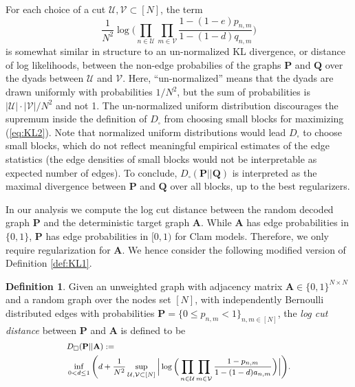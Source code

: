 \documentclass{article}
\theoremstyle{plain}
\theoremstyle{definition}
\newtheorem{definition}[theorem]{Definition}
\theoremstyle{remark}
\newcommand{\ron}[1]{{{\textcolor{red}{\textbf{[Ron:} {#1}\textbf{]}}}}}
\begin{document}
For each choice of a cut $\mathcal{U},\mathcal{V}\subset[N]$,  the term
 \begin{equation}
 \label{eq:KL2}
     \frac{1}{N^2}\log\Big(\prod_{n\in \mathcal{U}}\prod_{m\in \mathcal{V}}
\frac{1-(1-e)p_{n,m}}{1-(1-d)q_{n,m}}\Big)
 \end{equation}
is somewhat similar in structure to an un-normalized KL divergence, or distance of log likelihoods, between the non-edge probabilies of the graphs $\mathbf{P}$ and $\mathbf{Q}$ over the dyads between  $\mathcal{U}$ and $\mathcal{V}$. Here, ``un-normalized'' means that the dyads are drawn  uniformly with probabilities $1/N^2$, but the sum of probabilities is $|\mathcal{U}|\cdot|\mathcal{V}|/N^2$ and not 1. The un-normalized uniform distribution discourages the supremum inside the definition of $D_{\square}$ from choosing small blocks for maximizing (\ref{eq:KL2}). Note that normalized uniform distributions would lead $D_{\square}$ to choose  small blocks, which do not reflect meaningful empirical estimates of the edge statistics (the edge densities of small blocks would not be interpretable as expected number of edges). To conclude, $D_{\square}(\mathbf{P} || \mathbf{Q})$ is interpreted as the maximal divergence between $\mathbf{P}$ and $\mathbf{Q}$ over all blocks, up to the best regularizers. %

In our analysis we compute the log cut distance between the random decoded graph $\mathbf{P}$ and the deterministic target graph $\mathbf{A}$. While $\mathbf{A}$ has edge probabilities in $\{0,1\}$, $\mathbf{P}$ has edge probabilities in $[0,1)$ for Clam models. Therefore, we only require regularization  for $\mathbf{A}$. We hence consider the following modified version of Definition \ref{def:KL1}.
\begin{definition}
\label{def:KL2}
Given an unweighted graph with adjacency matrix $\mathbf{A}\in\{0,1\}^{N\times N}$ and a random graph over the nodes set $[N]$, with independently Bernoulli distributed edges with probabilities $\mathbf{P}=\{0\leq p_{n,m}<1\}_{n,m\in[N]}$, the \emph{log cut distance} between $\mathbf{P}$ and $\mathbf{A}$ is defined to be
    \[\footnotesize
    \begin{split}
    & D_{\square}(\mathbf{P} || \mathbf{A}):= \\
    & \inf_{0< d\leq1} \Bigg( d+ \frac{1}{N^2}\sup_{\mathcal{U},\mathcal{V}\subset[N]}\Big|\log\Big(\prod_{n\in \mathcal{U}}\prod_{m\in \mathcal{V}}
\frac{1-p_{n,m}}{1-(1-d)a_{n,m}}\Big)\Big|\Bigg).
\end{split}\]
\end{definition}
\end{document}
